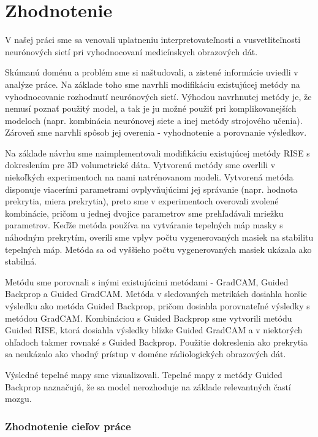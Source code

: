 \chapter{Zhodnotenie}

V našej práci sme sa venovali uplatneniu interpretovateľnosti a vusvetliteľnosti neurónových sietí pri vyhodnocovaní medicínskych obrazových dát. 

Skúmanú doménu a problém sme si naštudovali, a zistené informácie uviedli v analýze práce. Na základe toho sme navrhli modifikáciu existujúcej metódy na vyhodnocovanie rozhodnutí neurónových sietí. Výhodou navrhnutej metódy je, že nemusí poznať použitý model, a tak je ju možné použiť pri komplikovanejších modeloch (napr. kombinácia neurónovej siete a inej metódy strojového učenia). Zároveň sme narvhli spôsob jej overenia - vyhodnotenie a porovnanie výsledkov.

Na základe návrhu sme naimplementovali modifikáciu existujúcej metódy RISE s dokreslením pre 3D volumetrické dáta. Vytvorenú metódy sme overlili v niekoľkých experimentoch na nami natrénovanom modeli. Vytvorená metóda disponuje viacerími parametrami ovplyvňujúcimi jej správanie (napr. hodnota prekrytia, miera prekrytia), preto sme v experimentoch overovali zvolené kombinácie, pričom u jednej dvojice parametrov sme prehľadávali mriežku parametrov. Keďže metóda používa na vytváranie tepelných máp masky s náhodným prekrytím, overili sme vplyv počtu vygenerovaných masiek na stabilitu tepelných máp. Metóda sa od vyššieho počtu vygenerovaných masiek ukázala ako stabilná.

Metódu sme porovnali s inými existujúcimi metódami - GradCAM, Guided Backprop a Guided GradCAM. Metóda v sledovaných metrikách dosiahla horšie výsledku ako metóda Guided Backprop, pričom dosiahla porovnateľné výsledky s metódou GradCAM. Kombináciou s Guided Backprop sme vytvorili metódu Guided RISE, ktorá dosiahla výsledky blízke Guided GradCAM a v niektorých ohľadoch takmer rovnaké s Guided Backprop. Použitie dokreslenia ako prekrytia sa neukázalo ako vhodný prístup v doméne rádiologických obrazových dát. 

Výsledné tepelné mapy sme vizualizovali. Tepelné mapy z metódy Guided Backprop naznačujú, že sa model nerozhoduje na základe relevantných častí mozgu.

\subsection{Zhodnotenie cieľov práce}

